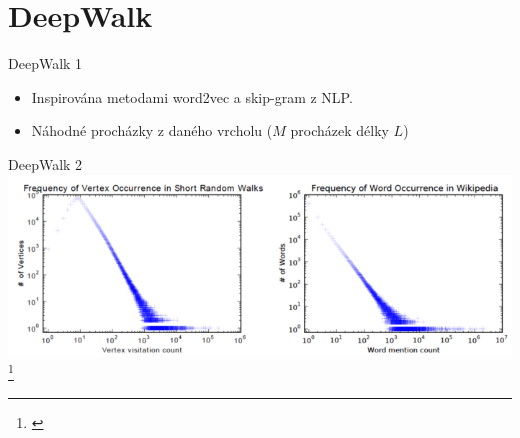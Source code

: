 \documentclass[10pt]{beamer}
\begin{document}
\section{DeepWalk}

\begin{frame}{DeepWalk 1}
	\begin{itemize}
		\item Inspirována metodami word2vec a skip-gram z NLP.
		\item Náhodné procházky z daného vrcholu (\( M \) procházek délky \( L \))
	\end{itemize}
\end{frame}

\begin{frame}{DeepWalk 2}
	\centering
	\includegraphics[width=0.8\pagewidth]{images/DeepWalk-word2vec.png}\footnote{\cite{perozzi_deepwalk_2014}}
\end{frame}
\end{document}
